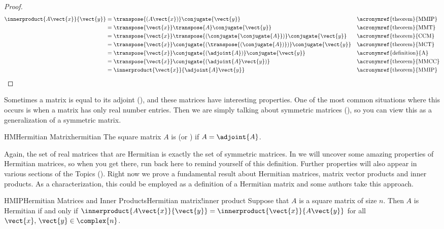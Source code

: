 %
\begin{proof}
%
\begin{align*}
\innerproduct{A\vect{x}}{\vect{y}}
&=\transpose{\left(A\vect{x}\right)}\conjugate{\vect{y}}&&\text{\acronymref{theorem}{MMIP}}\\
&=\transpose{\vect{x}}\transpose{A}\conjugate{\vect{y}}&&\text{\acronymref{theorem}{MMT}}\\
&=\transpose{\vect{x}}\transpose{\left(\conjugate{\conjugate{A}}\right)}\conjugate{\vect{y}}&&\text{\acronymref{theorem}{CCM}}\\
&=\transpose{\vect{x}}\conjugate{\left(\transpose{\left(\conjugate{A}\right)}\right)}\conjugate{\vect{y}}&&\text{\acronymref{theorem}{MCT}}\\
&=\transpose{\vect{x}}\conjugate{\left(\adjoint{A}\right)}\conjugate{\vect{y}}&&\text{\acronymref{definition}{A}}\\
&=\transpose{\vect{x}}\conjugate{\left(\adjoint{A}\vect{y}\right)}&&\text{\acronymref{theorem}{MMCC}}\\
&=\innerproduct{\vect{x}}{\adjoint{A}\vect{y}}&&\text{\acronymref{theorem}{MMIP}}
\end{align*}
%
\end{proof}
%
Sometimes a matrix is equal to its adjoint (), and these matrices have interesting properties.  One of the most common situations where this occurs is when a matrix has only real number entries.  Then we are simply talking about symmetric matrices (), so you can view this as a generalization of a symmetric matrix.
%
\begin{definition}{HM}{Hermitian Matrix}{hermitian}
The square matrix $A$ is  (or ) if $A=\adjoint{A}$.
\end{definition}
%
Again, the set of real matrices that are Hermitian is exactly the set of symmetric matrices.  In  we will uncover some amazing properties of Hermitian matrices, so when you get there, run back here  to remind yourself of this definition.  Further properties will also appear in various sections of the Topics ().  Right now we prove a fundamental result about Hermitian matrices, matrix vector products and inner products.  As a characterization, this could be employed as a definition of a Hermitian matrix and some authors take this approach.\par
%
%
\begin{theorem}{HMIP}{Hermitian Matrices and Inner Products}{Hermitian matrix!inner product}
Suppose that $A$ is a square matrix of size $n$.  Then $A$ is Hermitian if and only if $\innerproduct{A\vect{x}}{\vect{y}}=\innerproduct{\vect{x}}{A\vect{y}}$ for all $\vect{x},\,\vect{y}\in\complex{n}$.
\end{theorem}
